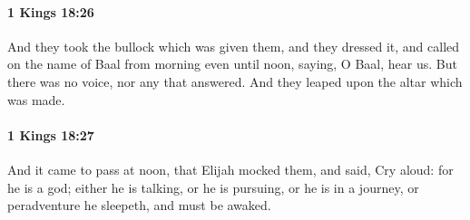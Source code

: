 		\paragraph{1 Kings 18:26} %
			\label{1KINGS-18-26}

			And they took the bullock which was given them, and they dressed it, and called on the name of Baal from morning even until noon, saying, O Baal, hear us. But there was no voice, nor any that answered. And they leaped upon the altar which was made.


		\paragraph{1 Kings 18:27} %
			\label{1KINGS-18-27}

			And it came to pass at noon, that Elijah mocked them, and said, Cry aloud: for he is a god; either he is talking, or he is pursuing, or he is in a journey, or peradventure he sleepeth, and must be awaked.

